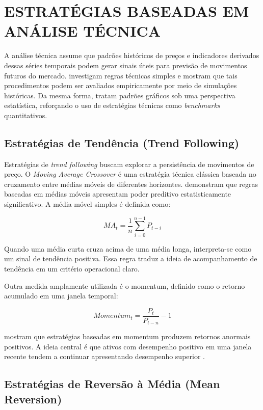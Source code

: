 \documentclass{eic-bcc-tcc}
\begin{document}
\section{ESTRATÉGIAS BASEADAS EM ANÁLISE TÉCNICA}

A análise técnica assume que padrões históricos de preços e indicadores derivados dessas séries temporais podem gerar sinais úteis para previsão de movimentos futuros do mercado. \citet{Brock1992} investigam regras técnicas simples e mostram que tais procedimentos podem ser avaliados empiricamente por meio de simulações históricas. Da mesma forma, \citet{Lo2000} tratam padrões gráficos sob uma perspectiva estatística, reforçando o uso de estratégias técnicas como \textit{benchmarks} quantitativos.

\subsection{Estratégias de Tendência (Trend Following)}

Estratégias de \textit{trend following} buscam explorar a persistência de movimentos de preço. O \textit{Moving Average Crossover} é uma estratégia técnica clássica baseada no cruzamento entre médias móveis de diferentes horizontes. \citet{Brock1992} demonstram que regras baseadas em médias móveis apresentam poder preditivo estatisticamente significativo. A média móvel simples é definida como:

\begin{equation}
MA_t = \frac{1}{n} \sum_{i=0}^{n-1} P_{t-i}
\end{equation}

Quando uma média curta cruza acima de uma média longa, interpreta-se como um sinal de tendência positiva. Essa regra traduz a ideia de acompanhamento de tendência em um critério operacional claro.

Outra medida amplamente utilizada é o momentum, definido como o retorno acumulado em uma janela temporal:

\begin{equation}
Momentum_t = \frac{P_t}{P_{t-n}} - 1
\end{equation}

\citet{JegadeeshTitman1993} mostram que estratégias baseadas em momentum produzem retornos anormais positivos. A ideia central é que ativos com desempenho positivo em uma janela recente tendem a continuar apresentando desempenho superior \citep{Moskowitz2012}.

\subsection{Estratégias de Reversão à Média (Mean Reversion)}
\end{document}
